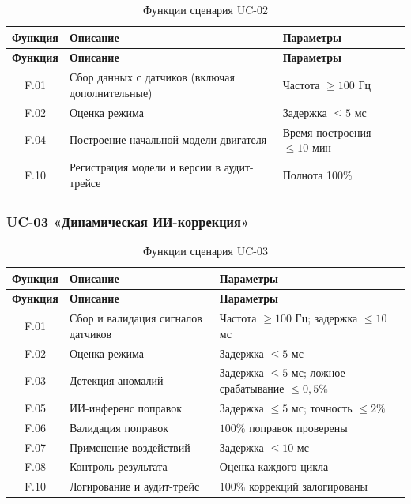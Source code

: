 \documentclass[14pt, a4paper]{extarticle}
\begin{document}
					\begin{xltabular}{\textwidth}{|c|L|L|}
						\caption{Функции сценария UC-02}\label{tab:func-uc02}\\
						\hline
						\textbf{Функция} & \textbf{Описание} & \textbf{Параметры} \\
						\hline
						\endfirsthead
						\hline
						\textbf{Функция} & \textbf{Описание} & \textbf{Параметры} \\
						\hline
						\endhead
						\hline
						\endfoot
						\hline
						\endlastfoot
						F.01 & Сбор данных с датчиков (включая дополнительные) & Частота \(\geq 100\) Гц \\
						\hline
						F.02 & Оценка режима & Задержка \(\leq 5\) мс \\
						\hline
						F.04 & Построение начальной модели двигателя & Время построения \(\leq 10\) мин \\
						\hline
						F.10 & Регистрация модели и версии в аудит-трейсе & Полнота 100\% \\
						\hline
					\end{xltabular}
					
					\subsubsection{UC-03 «Динамическая ИИ-коррекция»}
					
					\begin{xltabular}{\textwidth}{|c|L|L|}
						\caption{Функции сценария UC-03}\label{tab:func-uc03}\\
						\hline
						\textbf{Функция} & \textbf{Описание} & \textbf{Параметры} \\
						\hline
						\endfirsthead
						\hline
						\textbf{Функция} & \textbf{Описание} & \textbf{Параметры} \\
						\hline
						\endhead
						\hline
						\endfoot
						\hline
						\endlastfoot
						F.01 & Сбор и валидация сигналов датчиков & Частота \(\geq 100\) Гц; задержка \(\leq 10\) мс \\
						\hline
						F.02 & Оценка режима & Задержка \(\leq 5\) мс \\
						\hline
						F.03 & Детекция аномалий & Задержка \(\leq 5\) мс; ложное срабатывание \(\leq 0{,}5\%\) \\
						\hline
						F.05 & ИИ-инференс поправок & Задержка \(\leq 5\) мс; точность \(\leq 2\%\) \\
						\hline
						F.06 & Валидация поправок & \(100\%\) поправок проверены \\
						\hline
						F.07 & Применение воздействий & Задержка \(\leq 10\) мс \\
						\hline
						F.08 & Контроль результата & Оценка каждого цикла \\
						\hline
						F.10 & Логирование и аудит-трейс & \(100\%\) коррекций залогированы \\
						\hline
					\end{xltabular}
					
\end{document}
